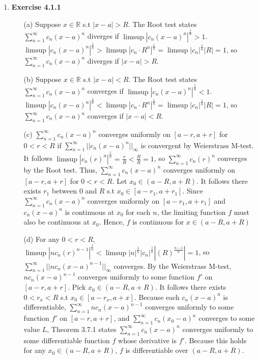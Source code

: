 \documentclass[10pt]{article}
\begin{document}
\begin{enumerate}[label=Problem \arabic*.]
\item \textbf{Exercise 4.1.1}
\begin{itemize}
    \item [(a)] Suppose $x\in\mathbb{R}$ s.t  $|x-a|>R$. The Root test states $\displaystyle\sum_{n=1}^{\infty}c_n(x-a)^n$ diverges if $\limsup|c_n(x-a)^n|^\frac{1}{n}>1$.
    $\limsup|c_n(x-a)^n|^\frac{1}{n}>\limsup|c_n\cdot R^n|^\frac{1}{n}=\limsup|c_n|^\frac{1}{n}|R|=1$, so $\displaystyle\sum_{n=1}^{\infty}c_n(x-a)^n$ diverges if $|x-a|>R$.
    \item [(b)] Suppose $x\in\mathbb{R}$ s.t  $|x-a|<R$. The Root test states $\displaystyle\sum_{n=1}^{\infty}c_n(x-a)^n$ converges if $\limsup|c_n(x-a)^n|^\frac{1}{n}<1$.
    $\limsup|c_n(x-a)^n|^\frac{1}{n}<\limsup|c_n\cdot R^n|^\frac{1}{n}=\limsup|c_n|^\frac{1}{n}|R|=1$, so $\displaystyle\sum_{n=1}^{\infty}c_n(x-a)^n$ converges if $|x-a|<R$.
    \item [(c)] $\displaystyle\sum_{n=1}^{\infty}c_n(x-a)^n$ converges uniformly on $[a-r,a+r]$ for $0<r<R$ if $\displaystyle\sum_{n=1}^{\infty}||c_n(x-a)^n||_\infty$ is convergent by Weierstrass M-test.
    It follows $\limsup|c_n(r)^n|^\frac{1}{n}=\frac{r}{R}<\frac{R}{R}=1$, so $\displaystyle\sum_{n=1}^{\infty}c_n(r)^n$ converges by the Root test.
    Thus, $\displaystyle\sum_{n=1}^{\infty}c_n(x-a)^n$ converges uniformly on $[a-r,a+r]$ for $0<r<R$. 
    Let $x_0\in(a-R,a+R)$. It follows there exists $r_1$ between $0$ and $R$ s.t $x_0\in[a-r_1,a+r_1]$. 
    Since $\displaystyle\sum_{n=1}^{\infty}c_n(x-a)^n$ converges uniformly on $[a-r_1,a+r_1]$ and $c_n(x-a)^n$ is continuous at $x_0$ for each $n$, the limiting function $f$ must also be continuous at $x_0$. 
    Hence, $f$ is continuous for $x\in(a-R,a+R)$
    \item [(d)] For any $0<r<R$, $\limsup|nc_n(r)^{n-1}|^\frac{1}{n}<\limsup|n|^\frac{1}{n}|c_n|^\frac{1}{n}|(R)^\frac{n-1}{n}|=1$, so $\displaystyle\sum_{n=1}^{\infty}||nc_n(x-a)^{n-1}||_\infty$ converges. By the Weierstrass M-test, $nc_n(x-a)^{n-1}$ converges uniformly to some function $f'$ on $[a-r,a+r]$.
    Pick $x_0\in(a-R,a+R)$. It follows there exists $0<r_x<R$ s.t $x_0\in[a-r_x,a+x]$. Because each $c_n(x-a)^n$ is differentiable, $\displaystyle \sum_{n=1}^{\infty}nc_n(x-a)^{n-1}$ converges uniformly to some function $f'$ on $[a-r,a+r]$, and $\displaystyle\sum_{n=1}^{\infty}c_n(x_0-a)^n$ converges to some value $L$, Theorem 3.7.1 states $\displaystyle\sum_{n=1}^{\infty}c_n(x-a)^n$ converges uniformly to some differentiable function $f$ whose derivative is $f'$.
    Because this holds for any $x_0\in(a-R,a+R)$, $f$ is differentiable over $(a-R,a+R)$.

\end{itemize}
\end{enumerate}
\end{document}
